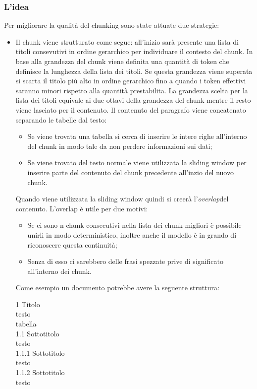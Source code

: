 \subsubsection{L'idea}
\label{subsubsec:ideachunking}
Per migliorare la qualità del chunking sono state attuate due strategie:
\begin{itemize}
    \item Il chunk viene strutturato come segue: all'inizio sarà presente una lista di titoli consevutivi in ordine gerarchico per individuare il contesto del chunk. In base alla grandezza del chunk viene definita una quantità di token che definisce la lunghezza della lista dei titoli. Se questa grandezza viene superata si scarta il titolo più alto in ordine gerarchico fino a quando i token effettivi saranno minori rispetto alla quantità prestabilita.
    La grandezza scelta per la lista dei titoli equivale ai due ottavi della grandezza del chunk mentre il resto viene lasciato per il contenuto.
    \noindent Il contenuto del paragrafo viene concatenato separando le tabelle dal testo:
    \begin{itemize}
        \item Se viene trovata una tabella si cerca di inserire le intere righe all'interno del chunk in modo tale da non perdere informazioni sui dati;
        \item Se viene trovato del testo normale viene utilizzata la sliding window per inserire parte del contenuto del chunk precedente all'inzio del nuovo chunk.
    \end{itemize}

    Quando viene utilizzata la sliding window quindi si creerà l'\emph{\gls{overlap}}\glsfirstoccur del contenuto.
    L'overlap è utile per due motivi:
    \begin{itemize}
        \item Se ci sono n chunk consecutivi nella lista dei chunk migliori è possibile unirli in modo deterministico, inoltre anche il modello è in grando di riconoscere questa continuità;
        \item Senza di esso ci sarebbero delle frasi spezzate prive di significato all'interno dei chunk.
    \end{itemize}

    Come esempio un documento potrebbe avere la seguente struttura:
    \begin{tcolorbox}[colback=white, colframe=black]
        1 Titolo\\
        testo\\
        tabella\\
        1.1 Sottotitolo\\
        testo\\
        1.1.1 Sottotitolo\\
        testo\\
        1.1.2 Sottotitolo\\
        testo\\
    \end{tcolorbox}


\end{itemize}
